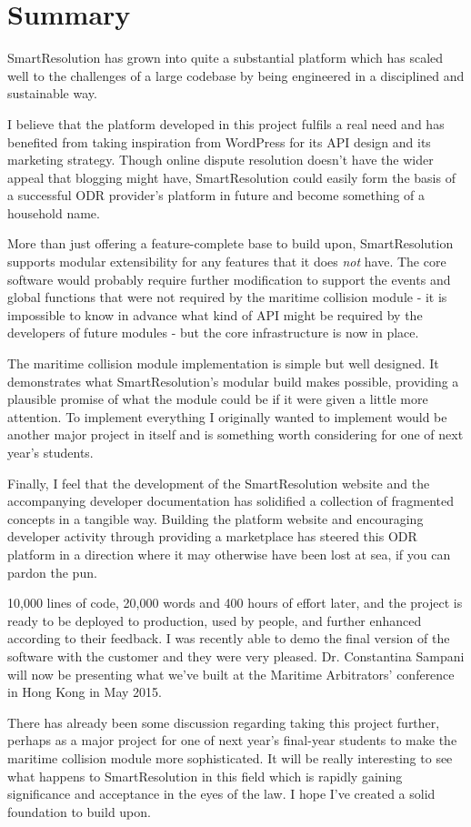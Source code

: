 \section{Summary}

SmartResolution has grown into quite a substantial platform which has scaled well to the challenges of a large codebase by being engineered in a disciplined and sustainable way.

I believe that the platform developed in this project fulfils a real need and has benefited from taking inspiration from WordPress for its API design and its marketing strategy. Though online dispute resolution doesn't have the wider appeal that blogging might have, SmartResolution could easily form the basis of a successful ODR provider's platform in future and become something of a household name.

More than just offering a feature-complete base to build upon, SmartResolution supports modular extensibility for any features that it does \emph{not} have. The core software would probably require further modification to support the events and global functions that were not required by the maritime collision module - it is impossible to know in advance what kind of API might be required by the developers of future modules - but the core infrastructure is now in place.

The maritime collision module implementation is simple but well designed. It demonstrates what SmartResolution's modular build makes possible, providing a plausible promise of what the module could be if it were given a little more attention. To implement everything I originally wanted to implement would be another major project in itself and is something worth considering for one of next year's students.

Finally, I feel that the development of the SmartResolution website and the accompanying developer documentation has solidified a collection of fragmented concepts in a tangible way. Building the platform website and encouraging developer activity through providing a marketplace has steered this ODR platform in a direction where it may otherwise have been lost at sea, if you can pardon the pun.

10,000 lines of code, 20,000 words and 400 hours of effort later, and the project is ready to be deployed to production, used by people, and further enhanced according to their feedback. I was recently able to demo the final version of the software with the customer and they were very pleased. Dr. Constantina Sampani will now be presenting what we've built at the Maritime Arbitrators' conference in Hong Kong in May 2015.

There has already been some discussion regarding taking this project further, perhaps as a major project for one of next year's final-year students to make the maritime collision module more sophisticated. It will be really interesting to see what happens to SmartResolution in this field which is rapidly gaining significance and acceptance in the eyes of the law. I hope I've created a solid foundation to build upon.
